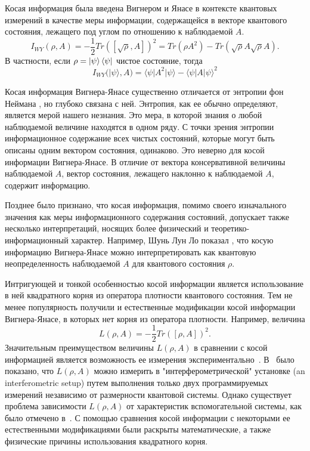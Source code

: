 Косая информация\cite{Wigner1963} была введена Вигнером и Янасе
в контексте квантовых измерений в качестве меры информации,
содержащейся в векторе квантового состояния, лежащего под углом по отношению к наблюдаемой $A$.
\begin{equation}\label{eq:wyi}
  I_{WY}(\rho, A)
  = -\frac{1}{2} Tr([\sqrt{\rho}, A])^2
  = Tr(\rho A^2) - Tr(\sqrt \rho A \sqrt \rho  A ).
\end{equation}
%
В частности, если $\rho = \left| \psi \right\rangle\left\langle \psi \right|$ чистое состояние, тогда
%
\begin{equation}
  I_{WY}(| \psi \rangle, A)
  = \langle \psi | A^2 | \psi \rangle - \langle \psi | A| \psi \rangle ^2
\end{equation}

Косая информация Вигнера-Янасе существенно отличается от энтропии фон Неймана \cite{Wigner1960, Lieb1973prl, Lieb1973, Wehrl1978},
но глубоко связана с ней.
Энтропия, как ее обычно определяют, является мерой нашего незнания\cite{Weaver1949}.
Это мера, в которой знания о любой наблюдаемой величине находятся в одном ряду.
С точки зрения энтропии информационное содержание всех чистых состояний,
которые могут быть описаны одним вектором состояния, одинаково.
Это неверно для косой информации Вигнера-Янасе.
В отличие от вектора консервативной величины наблюдаемой $A$,
вектор состояния, лежащего наклонно к наблюдаемой $A$, содержит информацию.

Позднее было признано, что косая информация,
помимо своего изначального значения как меры информационного содержания состояний,
допускает также несколько интерпретаций,
носящих более физический и теоретико-информационный характер.
Например, Шунь Лун Ло показал\cite{Luo2003prl, Luo2005, Luo2005pra, Luo2006, Luo2017} ,
что косую информацию Вигнера-Янасе можно интерпретировать
как квантовую неопределенность наблюдаемой $A$ для квантового состояния $\rho$.

Интригующей и тонкой особенностью косой информации является использование в ней квадратного корня из оператора плотности квантового состояния.
Тем не менее популярность получили и естественные модификации косой информации Вигнера-Янасе,
в которых нет корня из оператора плотности.
Например, величина
%
\begin{equation}\label{eq:wyi-modification-l}
  L(\rho, A)
  = -\frac{1}{2} Tr([\rho, A])^2.
\end{equation}
%
Значительным преимуществом величины $L(\rho, A)$ в сравнении с косой информацией является возможность ее измерения экспериментально~\cite{Girolami2014}.
В~\cite{Karpat2014} было показано,
что $L(\rho, A)$ можно измерить в "интерферометрической" установке (an interferometric setup) путем выполнения только двух программируемых измерений независимо от размерности квантовой системы.
Однако существует проблема зависимости $L(\rho, A)$ от характеристик вспомогательной системы, как было отмечено в~\cite{Yadin2016}.
С помощью сравнения косой информации с некоторыми ее естественными модификациями были раскрыты\cite{Luo2020} математические,
а также физические причины использования квадратного корня.

